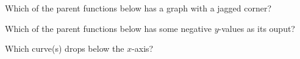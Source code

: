 \documentclass[numbers]{ximera}
\begin{document}
\begin{question}
Which of the parent functions below has a graph with a jagged corner?
\begin{solution}
\begin{multiple-choice}
\end{multiple-choice}
\end{solution}
\end{question}

\begin{question}
Which of the parent functions below has some negative $y$-values as its ouput?
\begin{solution}
\begin{multiple-choice}
\end{multiple-choice}
\begin{hint}
Which curve(s) drops below the $x$-axis?
\end{hint}
\end{solution}
\end{question}
\end{document}
